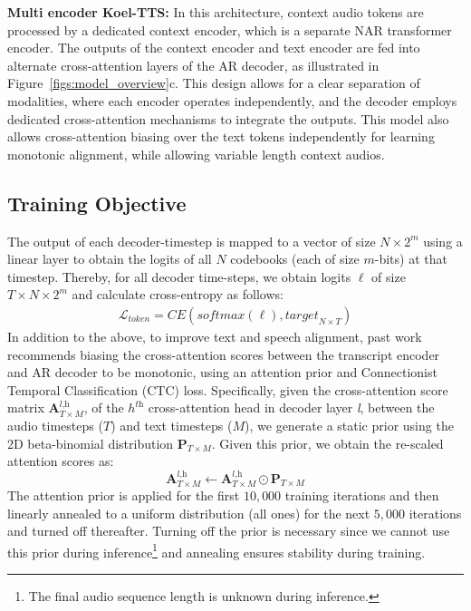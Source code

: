 \textbf{Multi encoder Koel-TTS:} In this architecture, context audio tokens are processed by a dedicated context encoder, which is a separate NAR transformer encoder. The outputs of the context encoder and text encoder are fed into alternate cross-attention layers of the AR decoder, as illustrated in Figure~\ref{figs:model_overview}c. This design allows for a clear separation of modalities, where each encoder operates independently, and the decoder employs dedicated cross-attention mechanisms to integrate the outputs.
This model also allows cross-attention biasing over the text tokens independently for learning monotonic alignment, while allowing variable length context audios.


\subsection{Training Objective}
The output of each decoder-timestep is mapped to a vector of size $N \times 2^m$ using a linear layer to obtain the logits of all $N$ codebooks (each of size $m$-bits) at that timestep. Thereby, for all decoder time-steps, we obtain logits $\ell$ of size $T \times N \times 2^m$ and calculate cross-entropy as follows:
\vspace{-2mm}
\begin{align*}
\mathcal{L}_\textit{token} = \textit{CE}\left(\textit{softmax}\left(\ell\right), \textit{target}_{N\times T}\right)
\end{align*}
In addition to the above, to improve text and speech alignment, past work~\cite{t5tts} recommends biasing the cross-attention scores between the transcript encoder and AR decoder to be monotonic, using an attention prior and Connectionist Temporal Classification (CTC) loss. Specifically, given the cross-attention score matrix $\mathbf{A}_{T\times M}^{\textit{l,h}}$,  of the $h^{\textit{th}}$ cross-attention head in decoder layer \textit{l}, between the audio timesteps ($T$) and text timesteps ($M$), we generate a static prior using the 2D beta-binomial distribution $\mathbf{P}_{T \times M}$.
Given this prior, we obtain the re-scaled attention scores as: 
$$\mathbf{A}_{T\times M}^{\textit{l,h}} \gets \mathbf{A}_{T\times M}^{\textit{l,h}} \odot  \mathbf{P}_{T \times M}$$ 
The attention prior is applied for the first $10{,}000$ training iterations and then linearly annealed to a uniform distribution (all ones) for the next $5{,}000$ iterations and turned off thereafter. Turning off the prior is necessary since we cannot use this prior during inference\footnote{The final audio sequence length is unknown during inference.} and annealing ensures stability during training.

